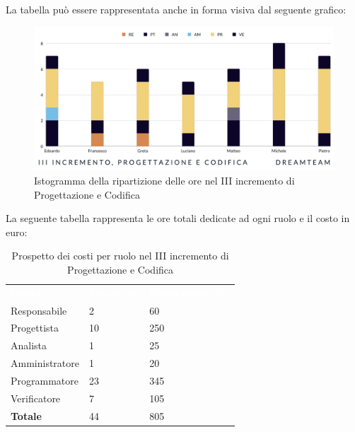 La tabella può essere rappresentata anche in forma visiva dal seguente grafico:
\begin{figure}[H]
\centering
\includegraphics[scale=0.55]{Sezioni/SezioniPreventivo/grafici/Preventivo_progettazione_III.png}
\caption{Istogramma della ripartizione delle ore nel III incremento di Progettazione e Codifica}
\end{figure}

La seguente tabella rappresenta le ore totali dedicate ad ogni ruolo e il costo in euro:

\begin{table}[H]
\begin{center}
\renewcommand{\arraystretch}{1.5}
\begin{tabular}{ m{}<{\centering}  m{}<{\centering} m{}<{\centering}}
	\rowcolor{darkblue}
	\textcolor{white}{\textbf{Ruolo}}&\textcolor{white}{\textbf{Totale ore}}&\textcolor{white}{\textbf{Costo totale (\euro)}}\\ 

	Responsabile  & 2 & 60 \\	
	
	Progettista & 10 & 250 \\
	
	Analista & 1 & 25 \\

	Amministratore & 1 & 20 \\
	
	Programmatore & 23 & 345 \\
	
	Verificatore & 7 & 105 \\
	
	\textbf{Totale} & 44 & 805 \\
	
\end{tabular}
\caption{Prospetto dei costi per ruolo nel III incremento di Progettazione e Codifica}
\end{center}
\end{table}


